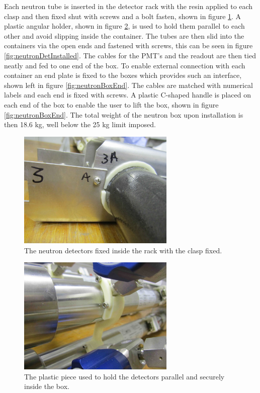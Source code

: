 Each neutron tube is inserted in the detector rack with the resin applied to each clasp and then fixed shut with screws and a bolt fasten, shown in figure \ref{fig:neutronDetClasp}. A plastic angular holder, shown in figure \ref{fig:neutronDetHolder}, is used to hold them parallel to each other and avoid slipping inside the container. The tubes are then slid into the containers via the open ends and fastened with screws, this can be seen in figure \ref{fig:neutronDetInstalled}. The cables for the PMT's and the readout are then tied neatly and fed to one end of the box. To enable external connection with each container an end plate is fixed to the boxes which provides such an interface, shown left in figure \ref{fig:neutronBoxEnd}. The cables are matched with numerical labels and each end is fixed with screws. A plastic C-shaped handle is placed on each end of the box to enable the user to lift the box, shown in figure \ref{fig:neutronBoxEnd}. The total weight of the neutron box upon installation is then 18.6 kg, well below the 25 kg limit imposed. 

\begin{figure}[htbp]
\begin{center}
\includegraphics[width=75mm]{Chapter6/figures/neutronTubeFixing1.jpg}
\caption{The neutron detectors fixed inside the rack with the clasp fixed.}
\label{fig:neutronDetClasp}
\end{center}
\end{figure}

\begin{figure}[htbp]
\begin{center}
\includegraphics[width=75mm]{Chapter6/figures/neutronTubeHolder1.jpg}
\caption{The plastic piece used to hold the detectors parallel and securely inside the box.}
\label{fig:neutronDetHolder}
\end{center}
\end{figure}

